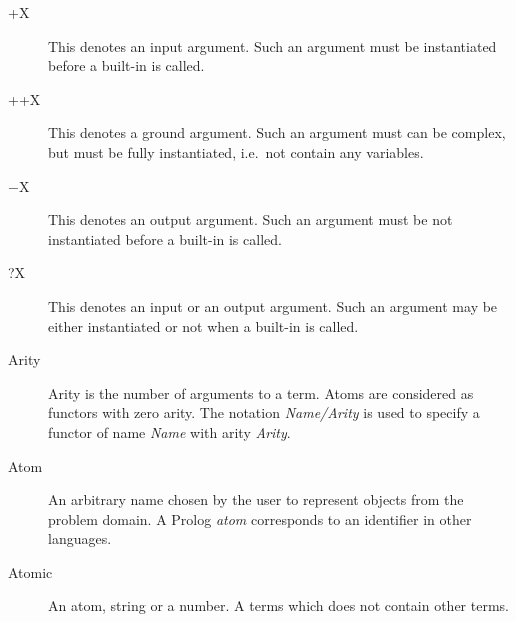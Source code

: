 \begin{description}

\item[+X]
This denotes an input argument. Such an argument must be instantiated before 
a built-in is called.

\item[++X]
This denotes a ground argument. Such an argument must can be complex,
but must be fully instantiated, i.e.\ not contain any variables.

\item[$-$X]
This denotes an output argument. Such an argument must be not 
instantiated before a built-in is called.

\item[?X]
This denotes an input or an output argument. Such an argument may be either 
instantiated or not  when a built-in is called.


\item[Arity]	
Arity is the number of arguments to a term.
Atoms are considered as functors with zero arity.
The notation {\it Name/Arity} is used to specify a functor of name 
{\it Name} with arity {\it Arity}.

\item[Atom]
An arbitrary name chosen by the user to represent objects from the 
problem domain.
A Prolog {\it atom} corresponds to an identifier in other languages.

\item[Atomic]
An atom, string or a number. A terms which does not contain other terms.


\end{description}

